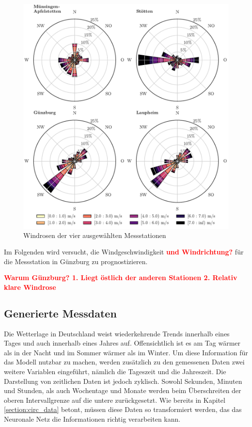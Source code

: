 \documentclass[
12pt, %
toc=listofnumbered, %
toc=chapterentrydotfill, %
numbers=noenddot, %
captions=tableheading, %
bibliography=numbered
]{scrreprt}
\let\Oldsubsection\subsection
\renewcommand{\subsection}{\FloatBarrier\Oldsubsection}
\newcommand{\highlight}[1]{\textbf{\textcolor{red}{#1}}}
\begin{document}
\begin{figure}[tph]
	\begin{center}
		\includegraphics[]{./images/windroses.pdf}
		\caption{Windrosen der vier ausgewählten Messstationen}
		\label{fig:windroses}
	\end{center}
\end{figure}

Im Folgenden wird versucht, die Windgeschwindigkeit \highlight{und Windrichtung?} für die Messstation in Günzburg zu prognostizieren. 

\highlight{Warum Günzburg? 1. Liegt östlich der anderen Stationen 2. Relativ klare Windrose}

\subsection{Generierte Messdaten}\label{section:gen_daten}
Die Wetterlage in Deutschland weist wiederkehrende Trends innerhalb eines Tages und auch innerhalb eines Jahres auf. Offensichtlich ist es am Tag wärmer als in der Nacht und im Sommer wärmer als im Winter. Um diese Information für das Modell nutzbar zu machen, werden zusätzlich zu den gemessenen Daten zwei weitere Variablen eingeführt, nämlich die Tageszeit und die Jahreszeit. 
Die Darstellung von zeitlichen Daten ist jedoch zyklisch. Sowohl Sekunden, Minuten und Stunden, als auch Wochentage und Monate werden beim Überschreiten der oberen Intervallgrenze auf die untere zurückgesetzt. Wie bereits in Kapitel \ref{section:circ_data} betont, müssen diese Daten so transformiert werden, das das Neuronale Netz die Informationen richtig verarbeiten kann.
\end{document}
